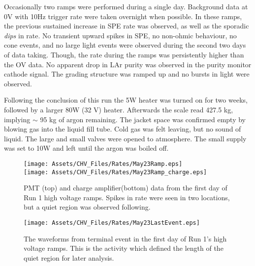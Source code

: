 Occasionally two ramps were performed during a single day.
Background data at 0V with 10Hz trigger rate were taken overnight when possible.
In these ramps, the previous sustained increase in SPE rate was observed, as well as the sporadic \textit{dips} in rate.
No transient upward spikes in SPE, no non-ohmic behaviour, no cone events, and no large light events were observed during the second two days of data taking.
Though, the rate during the ramps was persistently higher than the OV data.
No apparent drop in LAr purity was observed in the purity monitor cathode signal.
The grading structure was ramped up and no bursts in light were observed. 

Following the conclusion of this run the 5W heater was turned on for two weeks, followed by a larger 80W  (32 V) heater. 
Afterwards the scale read 427.5 kg, implying $\sim$ 95 kg of argon remaining.
The jacket space was confirmed empty by blowing gas into the liquid fill tube.
Cold gas was felt leaving, but no sound of liquid.
The large and small valves were opened to atmosphere.
The small supply was set to 10W and left until the argon was boiled off.



\begin{figure}
    \centering
    \texttt{[image: Assets/CHV\_Files/Rates/May23Ramp.eps]}\\
    \texttt{[image: Assets/CHV\_Files/Rates/May23Ramp\_charge.eps]}
    \caption[PMT (top) and charge amplifier(bottom) data from the first day of Run 1 high voltage ramps.]%
    {PMT (top) and charge amplifier(bottom) data from the first day of Run 1 high voltage ramps.
    Spikes in rate were seen in two locations, but a quiet region was observed following.}
    \label{fig:May23Ramp}
\end{figure}

\begin{figure}
    \begin{center}
    \texttt{[image: Assets/CHV\_Files/Rates/May23LastEvent.eps]}
    \end{center}
    \caption[The waveforms  from terminal event in the first day of CHV Run 1's high voltage ramps. ]%
    {The waveforms  from terminal event in the first day of Run 1's high voltage ramps. 
    This is the activity which defined the length of the quiet region for later analysis.}
    \label{fig:May23Terminal}
\end{figure}


